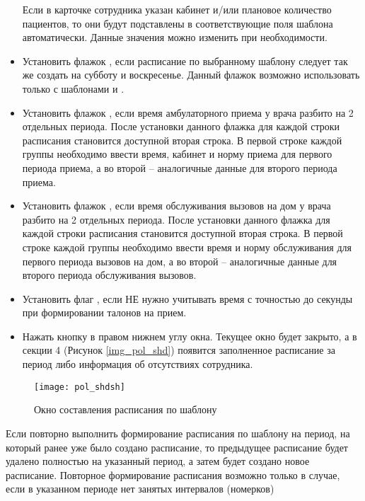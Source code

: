 \begin{itemize}
 Если в карточке сотрудника указан кабинет и/или плановое количество пациентов, то они будут подставлены в соответствующие поля шаблона автоматически. Данные значения можно изменить при необходимости.
 \item Установить флажок , если расписание по выбранному шаблону следует так же создать на субботу и воскресенье. Данный флажок возможно использовать только с шаблонами  и .
 \item Установить флажок , если время амбулаторного приема у врача разбито на 2 отдельных периода. После установки данного флажка для каждой строки расписания становится доступной вторая строка. В первой строке каждой группы необходимо ввести время, кабинет и норму приема для первого периода приема, а во второй – аналогичные данные для второго периода приема.
 \item Установить флажок , если время обслуживания вызовов на дом у врача разбито на 2 отдельных периода. После установки данного флажка для каждой строки расписания становится доступной вторая строка. В первой строке каждой группы необходимо ввести время и норму обслуживания для первого периода вызовов на дом, а во второй – аналогичные данные для второго периода обслуживания вызовов.
 \item Установить флаг , если НЕ нужно учитывать время с точностью до секунды при формировании талонов на прием.
 \item Нажать кнопку   в правом нижнем углу окна. Текущее окно будет закрыто, а в секции 4 (Рисунок \ref{img_pol_shd}) появится заполненное расписание за период либо информация об отсутствиях сотрудника.
\end{itemize}

\begin{figure}[ht]\centering
 \texttt{[image: pol\_shdsh]}
 \caption{Окно составления расписания по шаблону}
 \label{img_pol_shdsh}
\end{figure} 

\begin{prim}
Если повторно выполнить формирование расписания по шаблону на период, на который ранее уже было создано расписание, то предыдущее расписание будет удалено полностью на указанный период, а затем будет создано новое расписание. Повторное формирование расписания возможно только в случае, если в указанном периоде нет занятых интервалов (номерков)   
\end{prim}

